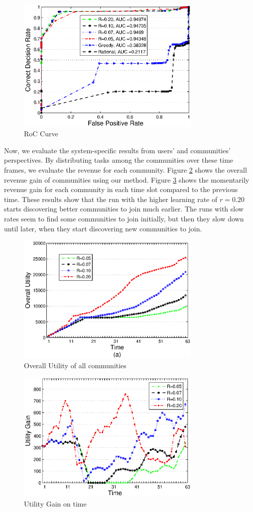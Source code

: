 \begin{figure}%
\centering
\includegraphics[width=3.5in]{figures/roc.eps}
\caption{RoC Curve}
\label{roc5}
\end{figure}
Now, we evaluate the system-specific results from users' and communities' perspectives. By distributing tasks among the communities over these time frames, we evaluate the revenue for each community. Figure \ref{stats1} shows the overall revenue gain of communities using our method. Figure \ref{stats2} shows the momentarily revenue gain for each community in each time slot compared to the previous time. These results show that the run with the higher learning rate of $r=0.20$ starts discovering better communities to join much earlier. The runs with slow rates seem to find some communities to join initially, but then they slow down until later, when they start discovering new communities to join.

\begin{figure}%
\centering
\includegraphics[width=3.5in]{figures/stats1.eps}
\caption{Overall Utility of all communities}
\label{stats1}
\end{figure}


\begin{figure}%
\centering
\includegraphics[width=3.5in]{figures/stats2.eps}
\caption{Utility Gain on time}
\label{stats2}
\end{figure}

